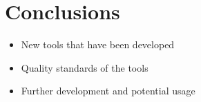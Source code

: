 
\chapter{Conclusions} 

\label{chp:conclusions}

\begin{itemize}
	\item New tools that have been developed
	\item Quality standards of the tools
	\item Further development and potential usage
\end{itemize}
